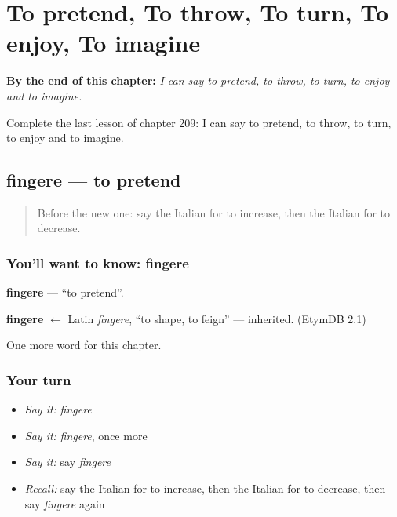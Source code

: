 
\chapter{To pretend, To throw, To turn, To enjoy, To imagine}
\label{ch:it-to-pretend-to-throw-to-turn-to-enjoy-to-imagine}

\begin{chapteropening}
\textbf{By the end of this chapter:} \emph{I can say to pretend, to throw, to turn, to enjoy and to imagine.}

Complete the last lesson of chapter 209: I can say to pretend, to throw, to turn, to enjoy and to imagine.
\end{chapteropening}

\section[fingere]{fingere — to pretend}

\label{lesson:IT-C209-fingere}



\begin{quote}
Before the new one: say the Italian for to increase, then the Italian for to decrease.
\end{quote}

\subsection*{You'll want to know: fingere}
\textbf{fingere} — \textquotedblleft{}to pretend\textquotedblright{}.

\begin{cousinweb}
\textbf{fingere} $\leftarrow$ Latin \emph{fingere}, \textquotedblleft{}to shape, to feign\textquotedblright{} — inherited. (EtymDB 2.1)
\end{cousinweb}

\begin{grammarlens}[title={What you've built}]
One more word for this chapter.
\end{grammarlens}

\subsection*{Your turn}
\begin{itemize}
\raggedright
  \item \emph{Say it:} \emph{fingere}
  \item \emph{Say it:} \emph{fingere}, once more
  \item \emph{Say it:} say \emph{fingere}
  \item \emph{Recall:} say the Italian for to increase, then the Italian for to decrease, then say \emph{fingere} again
\end{itemize}

